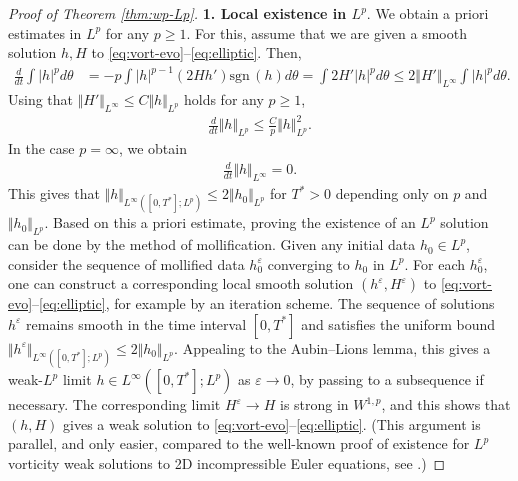 \documentclass[10pt]{article}
\theoremstyle{definition}
\theoremstyle{remark}
\numberwithin{equation}{section}
\newcommand{\nrm}[1]{\Vert#1\Vert}
\newcommand{\sgn}{{\mathrm{sgn}}\,}
\newcommand{\0}{\emptyset}
\newcommand{\tht}{\theta}
\newcommand{\varep}{\varepsilon}
\begin{document}
\begin{proof}[Proof of Theorem \ref{thm:wp-Lp}]
		\noindent \textbf{1. Local existence in $L^p$}. We obtain a priori estimates in $L^p$ for any $p\ge1$. For this, assume that we are given a smooth solution $h, H$ to \eqref{eq:vort-evo}--\eqref{eq:elliptic}. Then, \begin{equation}\label{eq:drv lp norm}
			\begin{split}
				\frac{d}{dt} \int |h|^p d\tht &= -p \int |h|^{p-1} (2H h') \sgn(h) d\tht  = \int 2H' |h|^p d\tht \le 2\nrm{H'}_{L^\infty} \int |h|^p d\tht. 
			\end{split}
		\end{equation} Using that $\nrm{H'}_{L^\infty} \le C\nrm{h}_{L^p}$ holds for any $p\ge1$, \begin{equation*}
			\begin{split}
				\frac{d}{dt} \nrm{h}_{L^p} \le \frac{C}{p} \nrm{h}_{L^p}^2. 
			\end{split}
		\end{equation*} In the case $p=\infty$, we obtain \begin{equation*}
			\begin{split}
				\frac{d}{dt} \nrm{h}_{L^\infty} = 0. 
			\end{split}
		\end{equation*} This gives that $\nrm{h}_{L^\infty([0,T^*];L^p)} \le 2\nrm{h_0}_{L^p}$ for $T^*>0$ depending only on $p$ and $\nrm{h_0}_{L^p}$. Based on this a priori estimate, proving the existence of an $L^p$ solution can be done by the method of mollification. Given any initial data $h_0 \in L^p$, consider the sequence of mollified data $h_0^{\varep}$ converging to $h_0$ in $L^p$. For each $h_0^\varep$, one can construct a corresponding local smooth solution $(h^\varep,H^\varep)$ to  \eqref{eq:vort-evo}--\eqref{eq:elliptic}, for example by an iteration scheme. The sequence of solutions $h^\varep$ remains smooth in the time interval $[0,T^*]$ and satisfies the uniform bound $\nrm{h^\varep}_{L^\infty([0,T^*];L^p)} \le 2\nrm{h_0}_{L^p}$. Appealing to the Aubin--Lions lemma, this gives a weak-$L^p$ limit $h \in L^\infty([0,T^*];L^p)$ as $\varep\to0$, by passing to a subsequence if necessary. The corresponding limit  $H^\varep\to H$ is strong in $W^{1,p}$, and this shows that $(h,H)$ gives a weak solution to \eqref{eq:vort-evo}--\eqref{eq:elliptic}. (This argument is parallel, and only easier, compared to the well-known proof of existence for $L^p$ vorticity weak solutions to 2D incompressible Euler equations, see \cite{MB}.)
		
		
		\medskip
		

\end{proof}
\end{document}
